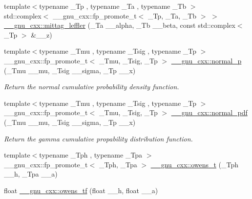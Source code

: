 \begin{DoxyCompactItemize}
\item 
{\footnotesize template$<$typename \+\_\+\+Tp , typename \+\_\+\+Ta , typename \+\_\+\+Tb $>$ }\\std\+::complex$<$ \+\_\+\+\_\+gnu\+\_\+cxx\+::fp\+\_\+promote\+\_\+t$<$ \+\_\+\+Tp, \+\_\+\+Ta, \+\_\+\+Tb $>$ $>$ \hyperlink{group__gnu__math__spec__func_ga1a51079e00fbe5473d8cf9ad3304c5c6}{\+\_\+\+\_\+gnu\+\_\+cxx\+::mittag\+\_\+leffler} (\+\_\+\+Ta \+\_\+\+\_\+alpha, \+\_\+\+Tb \+\_\+\+\_\+beta, const std\+::complex$<$ \+\_\+\+Tp $>$ \&\+\_\+\+\_\+z)
\item 
{\footnotesize template$<$typename \+\_\+\+Tmu , typename \+\_\+\+Tsig , typename \+\_\+\+Tp $>$ }\\\+\_\+\+\_\+gnu\+\_\+cxx\+::fp\+\_\+promote\+\_\+t$<$ \+\_\+\+Tmu, \+\_\+\+Tsig, \+\_\+\+Tp $>$ \hyperlink{group__gnu__math__spec__func_gaeb735b0fb98c7684ba61b8940f50193c}{\+\_\+\+\_\+gnu\+\_\+cxx\+::normal\+\_\+p} (\+\_\+\+Tmu \+\_\+\+\_\+mu, \+\_\+\+Tsig \+\_\+\+\_\+sigma, \+\_\+\+Tp \+\_\+\+\_\+x)
\begin{DoxyCompactList}\small\item\em Return the normal cumulative probability density function. \end{DoxyCompactList}\item 
{\footnotesize template$<$typename \+\_\+\+Tmu , typename \+\_\+\+Tsig , typename \+\_\+\+Tp $>$ }\\\+\_\+\+\_\+gnu\+\_\+cxx\+::fp\+\_\+promote\+\_\+t$<$ \+\_\+\+Tmu, \+\_\+\+Tsig, \+\_\+\+Tp $>$ \hyperlink{group__gnu__math__spec__func_gab795379781dea732cbc7556351760401}{\+\_\+\+\_\+gnu\+\_\+cxx\+::normal\+\_\+pdf} (\+\_\+\+Tmu \+\_\+\+\_\+mu, \+\_\+\+Tsig \+\_\+\+\_\+sigma, \+\_\+\+Tp \+\_\+\+\_\+x)
\begin{DoxyCompactList}\small\item\em Return the gamma cumulative propability distribution function. \end{DoxyCompactList}\item 
{\footnotesize template$<$typename \+\_\+\+Tph , typename \+\_\+\+Tpa $>$ }\\\+\_\+\+\_\+gnu\+\_\+cxx\+::fp\+\_\+promote\+\_\+t$<$ \+\_\+\+Tph, \+\_\+\+Tpa $>$ \hyperlink{group__gnu__math__spec__func_gab4e367aae19853cca3af99eead01fcaa}{\+\_\+\+\_\+gnu\+\_\+cxx\+::owens\+\_\+t} (\+\_\+\+Tph \+\_\+\+\_\+h, \+\_\+\+Tpa \+\_\+\+\_\+a)
\item 
float \hyperlink{group__gnu__math__spec__func_gac24d32e9b072c4953654d5559f992871}{\+\_\+\+\_\+gnu\+\_\+cxx\+::owens\+\_\+tf} (float \+\_\+\+\_\+h, float \+\_\+\+\_\+a)

\end{DoxyCompactItemize}
